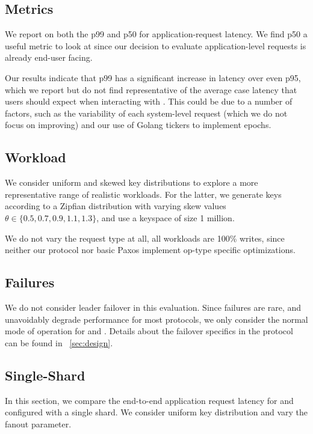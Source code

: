 
\subsection{Metrics}
We report on both the p99 and p50 for application-request latency. 
We find p50 a useful metric to look at since our decision to evaluate application-level requests is already end-user facing. 

Our results indicate that p99 has a significant increase in latency over even p95, which we report but do not find representative of the average case latency that users should expect when interacting with \system. This could be due to a number of factors, such as the variability of each system-level request (which we do not focus on improving) and our use of Golang tickers to implement epochs.

\subsection{Workload}
We consider uniform and skewed key distributions to explore a more representative range of realistic workloads. For the latter, we generate keys according to a Zipfian distribution with varying skew values $\theta \in \{0.5, 0.7, 0.9, 1.1, 1.3\}$, and use a keyspace of size 1 million. 

We do not vary the request type at all, all workloads are 100\% writes, since neither our protocol nor basic Paxos implement op-type specific optimizations. 

\subsection{Failures}
We do not consider leader failover in this evaluation. Since failures are rare, and unavoidably degrade performance for most protocols, we only consider the normal mode of operation for \system and \mpaxos. Details about the failover specifics in the protocol can be found in ~\ref{sec:design}.

\subsection{Single-Shard}
In this section, we compare the end-to-end application request latency for \system and \mpaxos configured with a single shard. We consider uniform key distribution and vary the fanout parameter.

